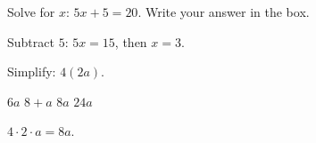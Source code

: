 \question[5]
Solve for $x$: $5x + 5 = 20$. Write your answer in the box.
\begin{solutionorbox}[0.75in]
  Subtract $5$: $5x=15$, then $x=3$.
\end{solutionorbox}


\question[5]
Simplify: $4(2a)$.
\begin{choices}
  \choice $6a$
  \choice $8+a$
  \CorrectChoice $8a$
  \choice $24a$
\end{choices}
\begin{solution}
  $4\cdot 2\cdot a = 8a$.
\end{solution}



\newpage
{}
